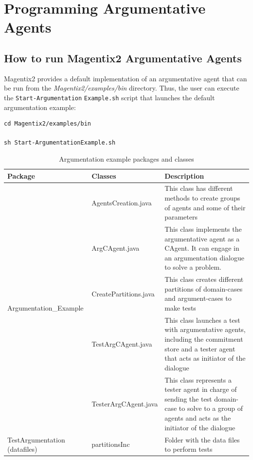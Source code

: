 \section{Programming Argumentative Agents}
\label{subsec:howTo}

\subsection{How to run Magentix2 Argumentative Agents}
\label{subsubsec:howToRun}

Magentix2 provides a default implementation of an argumentative agent that can be run from the \textit{Magentix2/examples/bin} directory. Thus, the user can execute the \lstinline{Start-Argumentation} \lstinline{Example.sh} script that launches the default argumentation example:

\begin{lstlisting}
cd Magentix2/examples/bin

sh Start-ArgumentationExample.sh
\end{lstlisting}

\begin{table}[h!t]
\begin{tabular}{|l|l|p{5cm}|}
\hline
\textbf{Package} & \textbf{Classes} & \textbf{Description} \\ \hline
\multirow{5}{*}{Argumentation\_Example } & AgentsCreation.java & This class has different methods to create groups of agents and some of their parameters \\
 & ArgCAgent.java & This class implements the argumentative agent as a CAgent. It can engage in an argumentation dialogue to solve a problem.  \\
 & CreatePartitions.java & This class creates different partitions of domain-cases and argument-cases to make tests \\
 & TestArgCAgent.java &  This class launches a test with argumentative agents, including the commitment store and a tester agent that acts as initiator of the dialogue\\
 & TesterArgCAgent.java & This class represents a tester agent in charge of sending the test domain-case to solve to a group of agents and acts as the initiator of the dialogue \\ \hline
TestArgumentation (datafiles) & partitionsInc & Folder with the data files to perform tests \\ \hline

\end{tabular}
\caption{Argumentation example packages and classes}
\label{tab:argAgentsExamplePackages}
\end{table}

